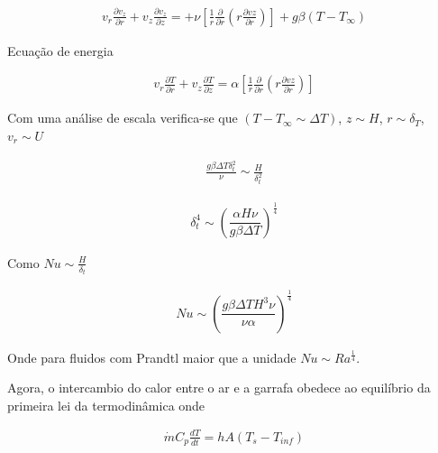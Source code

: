 \documentclass[12pt]{article}
\begin{document}
\begin{equation}
	\begin{aligned}
		v_{r}\frac{\partial v_{z}}{\partial r} + v_{z}\frac{\partial v_{z}}{\partial z} = + \nu \left[ \frac{1}{r} \frac{\partial}{\partial r}\left( r\frac{\partial vz}{\partial r}\right) \right] + g\beta (T-T_{\infty})
	\end{aligned}
\end{equation}

Ecuação  de energia

\begin{equation}
	\begin{aligned}
		v_{r}\frac{\partial T}{\partial r} + v_{z}\frac{\partial T}{\partial z} =  \alpha \left[ \frac{1}{r} \frac{\partial}{\partial r}\left( r\frac{\partial vz}{\partial r}\right) \right] 
	\end{aligned}
\end{equation}

Com uma análise de escala verifica-se que $( T-T_{\infty} \sim \Delta T)$, $z \sim H$, $r \sim\delta_{T} $, $v_{r}\sim U$

\begin{equation}
	\begin{aligned}
		\frac{g\beta\Delta T \delta_{t}^{2}}{\nu}\sim\frac{H}{\delta_{t}^{2}}
	\end{aligned}
\end{equation}

\begin{equation}
	\begin{aligned}
		 \delta_{t}^{4} \sim \left( \dfrac{\alpha H \nu}{g\beta\Delta T}\right)^{\frac{1}{4}} 
	\end{aligned}
\end{equation}

Como $Nu \sim \frac{H}{\delta_{t}}$

\begin{equation}
	\begin{aligned}
		Nu \sim \left( \dfrac{g\beta \Delta T H^{3} \nu}{\nu \alpha}\right)^{\frac{1}{4}} 
	\end{aligned}
\end{equation}

Onde para fluidos com Prandtl maior que a unidade $Nu \sim Ra^{\frac{1}{4}}$.



Agora, o intercambio do calor entre o ar e a garrafa obedece ao equilíbrio da primeira lei da termodinâmica onde

\begin{equation}
	\begin{aligned}
		\dot{m} C_{p} \frac{dT}{dt} = hA(T_{s}-T_{inf})
	\end{aligned}
\end{equation}
\end{document}
